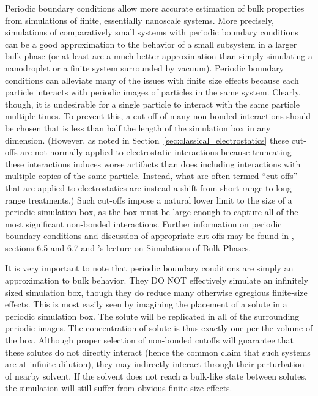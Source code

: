 \documentclass[9pt,bestpractices]{livecoms}
\begin{document}
Periodic boundary conditions allow more accurate estimation of bulk properties from simulations of finite, essentially nanoscale systems.
More precisely, simulations of comparatively small systems with periodic boundary conditions can be a good approximation to the behavior of a small subsystem in a larger bulk phase (or at least are a much better approximation than simply simulating a nanodroplet or a finite system surrounded by vacuum).
Periodic boundary conditions can alleviate many of the issues with finite size effects because each particle interacts with periodic images of particles in the same system.
Clearly, though, it is undesirable for a single particle to interact with the same particle multiple times.
To prevent this, a cut-off of many non-bonded interactions should be chosen that is less than half the length of the simulation box in any dimension.
(However, as noted in Section~\ref{sec:classical_electrostatics} these cut-offs are not normally applied to electrostatic interactions because truncating these interactions induces worse artifacts than does including interactions with multiple copies of the same particle. 
Instead, what are often termed ``cut-offs'' that are applied to electrostatics are instead a shift from short-range to long-range treatments.)
Such cut-offs impose a natural lower limit to the size of a periodic simulation box, as the box must be large enough to capture all of the most significant non-bonded interactions.
Further information on periodic boundary conditions and discussion of appropriate cut-offs may be found in \citet{LeachBook}, sections 6.5 and 6.7 and \citet{ShellNotes}'s lecture on Simulations of Bulk Phases.

It is very important to note that periodic boundary conditions are simply an approximation to bulk behavior.
They DO NOT effectively simulate an infinitely sized simulation box, though they do reduce many otherwise egregious finite-size effects.
This is most easily seen by imagining the placement of a solute in a periodic simulation box.
The solute will be replicated in all of the surrounding periodic images.
The concentration of solute is thus exactly one per the volume of the box.
Although proper selection of non-bonded cutoffs will guarantee that these solutes do not directly interact (hence the common claim that such systems are at infinite dilution), they may indirectly interact through their perturbation of nearby solvent.
If the solvent does not reach a bulk-like state between solutes, the simulation will still suffer from obvious finite-size effects.
\end{document}
